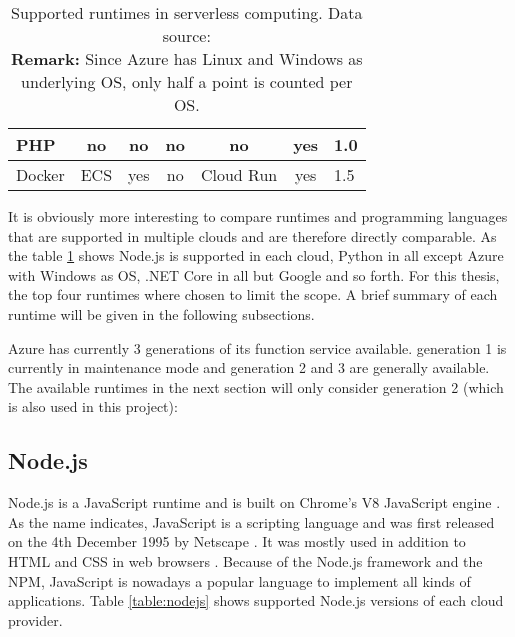 \begin{table}[htp]
{\begin{tabular}{|l|c|c|c|c|c||l|}
  PHP & \cellcolor{red!25}no & \cellcolor{red!25}no & \cellcolor{red!25}no & \cellcolor{red!25}no & \cellcolor{green!25}yes & 1.0 \\ \hline
  Docker & \cellcolor{yellow!25}ECS & \cellcolor{green!25}yes & \cellcolor{red!25}no & \cellcolor{yellow!25}Cloud Run & \cellcolor{green!25}yes & 1.5 \\
 \hline
\end{tabular}
}
\caption[Supported runtimes in serverless computing]{Supported runtimes in serverless computing.  Data source: \cite{AWSLambdaLanguages, AzureFunctionsLanguages, GoogleFunctionsLanguages, IBMRuntimes}\\ \textbf{Remark:} Since Azure has Linux and Windows as underlying \gls{OS}, only half a point is counted per \gls{OS}.}
\label{table:programming_languages}
\end{table}

It is obviously more interesting to compare runtimes and programming languages that are supported in multiple clouds and are therefore directly comparable. As the table \ref{table:programming_languages} shows Node.js is supported in each cloud, Python in all except Azure with Windows as \gls{OS}, .NET Core in all but Google and so forth. For this thesis, the top four runtimes where chosen to limit the scope. A brief summary of each runtime will be given in the following subsections.
\begin{remark}
Azure has currently 3 generations of its function service available. generation 1 is currently in maintenance mode and generation 2 and 3 are generally available. The available runtimes in the next section will only consider generation 2 (which is also used in this project):
\end{remark}

\subsection{Node.js}

Node.js is a JavaScript runtime and is built on Chrome's V8 JavaScript engine \cite{Nodejs}. As the name indicates, JavaScript is a scripting language and was first released on the 4th December 1995 by Netscape \cite{JavaScript}. It was mostly used in addition to \gls{HTML} and \gls{CSS} in web browsers \cite{JavaScript}. Because of the Node.js framework and the \gls{NPM}, JavaScript is nowadays a popular language to implement all kinds of applications. Table \ref{table:nodejs} shows supported Node.js versions of each cloud provider. 

